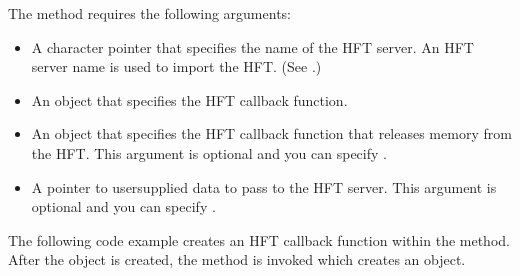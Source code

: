 \documentclass[letterpaper,12pt,english,openany,oneside]{sphinxmanual}
\begin{document}
The  method requires the following arguments:
\begin{itemize}
\item {} 
A character pointer that specifies the name of the HFT server. An HFT server name is used to import the HFT. (See .)

\item {} 
An  object that specifies the HFT callback function.

\item {} 
An  object that specifies the HFT callback function that releases memory from the HFT. This argument is optional and you can specify .

\item {} 
A pointer to user\sphinxhyphen{}supplied data to pass to the HFT server. This argument is optional and you can specify .

\end{itemize}

The following code example creates an HFT callback function within the  method. After the  object is created, the  method is invoked which creates an  object.

\begin{sphinxVerbatim}[commandchars=\\\{\}]
   
  
  

    
      


   
       
   
   
 
\end{sphinxVerbatim}
\end{document}
